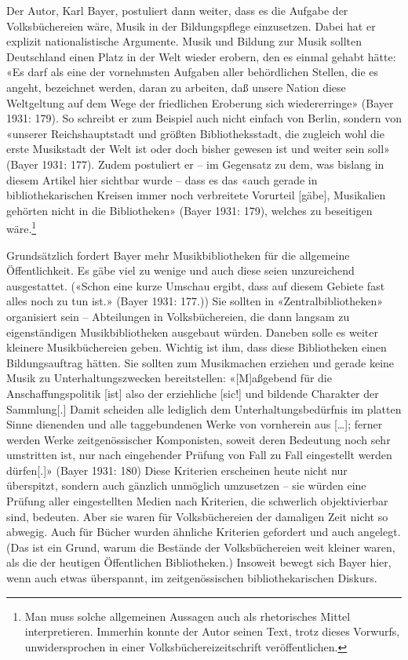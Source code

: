 \documentclass[a4paper,
fontsize=11pt,
oneside,
numbers=noperiodatend,
parskip=half-,
bibliography=totoc,
final
]{scrartcl}
\begin{document}
Der Autor, Karl Bayer, postuliert dann weiter, dass es die Aufgabe der
Volksbüchereien wäre, Musik in der Bildungspflege einzusetzen. Dabei hat
er explizit nationalistische Argumente. Musik und Bildung zur Musik
sollten Deutschland einen Platz in der Welt wieder erobern, den es
einmal gehabt hätte: «Es darf als eine der vornehmsten Aufgaben aller
behördlichen Stellen, die es angeht, bezeichnet werden, daran zu
arbeiten, daß unsere Nation diese Weltgeltung auf dem Wege der
friedlichen Eroberung sich wiedererringe» (Bayer 1931: 179). So schreibt
er zum Beispiel auch nicht einfach von Berlin, sondern von «unserer
Reichshauptstadt und größten Bibliotheksstadt, die zugleich wohl die
erste Musikstadt der Welt ist oder doch bisher gewesen ist und weiter
sein soll» (Bayer 1931: 177). Zudem postuliert er -- im Gegensatz zu
dem, was bislang in diesem Artikel hier sichtbar wurde -- dass es das
«auch gerade in bibliothekarischen Kreisen immer noch verbreitete
Vorurteil {[}gäbe{]}, Musikalien gehörten nicht in die Bibliotheken»
(Bayer 1931: 179), welches zu beseitigen wäre.\footnote{Man muss solche
  allgemeinen Aussagen auch als rhetorisches Mittel interpretieren.
  Immerhin konnte der Autor seinen Text, trotz dieses Vorwurfs,
  unwidersprochen in einer Volksbüchereizeitschrift veröffentlichen.}

Grundsätzlich fordert Bayer mehr Musikbibliotheken für die allgemeine
Öffentlichkeit. Es gäbe viel zu wenige und auch diese seien unzureichend
ausgestattet. («Schon eine kurze Umschau ergibt, dass auf diesem Gebiete
fast alles noch zu tun ist.» (Bayer 1931: 177.)) Sie sollten in
«Zentralbibliotheken» organisiert sein -- Abteilungen in
Volksbüchereien, die dann langsam zu eigenständigen Musikbibliotheken
ausgebaut würden. Daneben solle es weiter kleinere Musikbüchereien
geben. Wichtig ist ihm, dass diese Bibliotheken einen Bildungsauftrag
hätten. Sie sollten zum Musikmachen erziehen und gerade keine Musik zu
Unterhaltungszwecken bereitstellen: «{[}M{]}aßgebend für die
Anschaffungspolitik {[}ist{]} also der erziehliche {[}sic!{]} und
bildende Charakter der Sammlung{[}.{]} Damit scheiden alle lediglich dem
Unterhaltungsbedürfnis im platten Sinne dienenden und alle taggebundenen
Werke von vornherein aus {[}\ldots{]}; ferner werden Werke
zeitgenössischer Komponisten, soweit deren Bedeutung noch sehr
umstritten ist, nur nach eingehender Prüfung von Fall zu Fall
eingestellt werden dürfen{[}.{]}» (Bayer 1931: 180) Diese Kriterien
erscheinen heute nicht nur überspitzt, sondern auch gänzlich unmöglich
umzusetzen -- sie würden eine Prüfung aller eingestellten Medien nach
Kriterien, die schwerlich objektivierbar sind, bedeuten. Aber sie waren
für Volksbüchereien der damaligen Zeit nicht so abwegig. Auch für Bücher
wurden ähnliche Kriterien gefordert und auch angelegt. (Das ist ein
Grund, warum die Bestände der Volksbüchereien weit kleiner waren, als
die der heutigen Öffentlichen Bibliotheken.) Insoweit bewegt sich Bayer
hier, wenn auch etwas überspannt, im zeitgenössischen bibliothekarischen
Diskurs.
\end{document}
